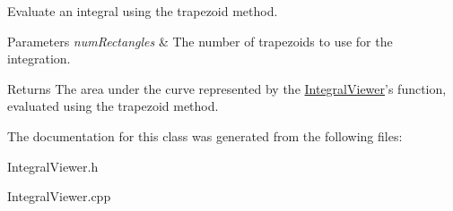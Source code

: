 \-Evaluate an integral using the trapezoid method. 


\begin{DoxyParams}{\-Parameters}
{\em num\-Rectangles} & \-The number of trapezoids to use for the integration. \\
\hline
\end{DoxyParams}
\begin{DoxyReturn}{\-Returns}
\-The area under the curve represented by the \hyperlink{classtsgl_1_1_integral_viewer}{\-Integral\-Viewer}'s function, evaluated using the trapezoid method. 
\end{DoxyReturn}


\-The documentation for this class was generated from the following files\-:\begin{DoxyCompactItemize}
\item 
\-Integral\-Viewer.\-h\item 
\-Integral\-Viewer.\-cpp\end{DoxyCompactItemize}
